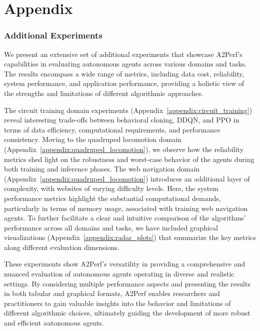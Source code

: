 \part{Appendix} %
\parttoc %

\section{Additional Experiments}
\label{appendix:additional_experiments}

We present an extensive set of additional experiments that showcase A2Perf's capabilities in evaluating autonomous agents across various domains and tasks. The results encompass a wide range of metrics, including data cost, reliability, system performance, and application performance, providing a holistic view of the strengths and limitations of different algorithmic approaches.

The circuit training domain experiments (Appendix~\ref{appendix:circuit_training}) reveal interesting trade-offs between behavioral cloning, DDQN, and PPO in terms of data efficiency, computational requirements, and performance consistency. Moving to the quadruped locomotion domain (Appendix~\ref{appendix:quadruped_locomotion}), we observe how the reliability metrics shed light on the robustness and worst-case behavior of the agents during both training and inference phases. The web navigation domain (Appendix~\ref{appendix:quadruped_locomotion}) introduces an additional layer of complexity, with websites of varying difficulty levels. Here, the system performance metrics highlight the substantial computational demands, particularly in terms of memory usage, associated with training web navigation agents. To further facilitate a clear and intuitive comparison of the algorithms' performance across all domains and tasks, we have included graphical visualizations (Appendix~\ref{appendix:radar_plots}) that summarize the key metrics along different evaluation dimensions.

These experiments show A2Perf's versatility in providing a comprehensive and nuanced evaluation of autonomous agents operating in diverse and realistic settings. By considering multiple performance aspects and presenting the results in both tabular and graphical formats, A2Perf enables researchers and practitioners to gain valuable insights into the behavior and limitations of different algorithmic choices, ultimately guiding the development of more robust and efficient autonomous agents.

